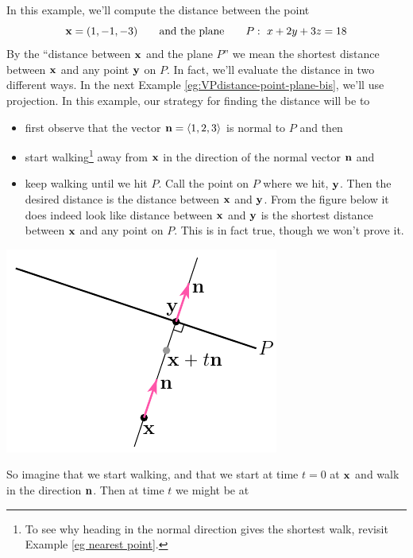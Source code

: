 \begin{eg}\label{eg:VPdistance-point-plane}
In this example, we'll compute the distance between the point
\begin{equation*}
\mathbf{x} = (1,-1,-3) \qquad\text{and the plane}\qquad
P:\ x+2y+3z=18
\end{equation*}
By the ``distance between $\mathbf{x}$ and the plane $P$'' we mean the shortest
distance between $\mathbf{x}$ and any point $\mathbf{y}$ on $P$. In fact, we'll evaluate the
distance in two different ways. In the next 
Example \ref{eg:VPdistance-point-plane-bis}, we'll use projection.
In this example, our strategy for finding the distance will be to
\begin{itemize}
\item first observe that the vector $\mathbf{n}=\left< 1,2,3\right>$ is normal to $P$ 
and then
\item start walking\footnote{To see why heading in the normal direction gives
the shortest walk, revisit Example \ref{eg nearest point}.} away from $\mathbf{x}$ 
in the  direction of the normal vector $\mathbf{n}$ and
\item keep walking until we hit $P$. Call the point on $P$ where we hit,
$\mathbf{y}$. Then the desired distance is the distance between $\mathbf{x}$ and $\mathbf{y}$.
From the figure below it does indeed look like distance between $\mathbf{x}$ and $\mathbf{y}$
is the shortest distance between $\mathbf{x}$ and any point on $P$. This is in 
fact true, though we won't prove it.
\end{itemize}
\begin{efig}
\begin{center}
   \includegraphics{pointDist.pdf}
\end{center}
\end{efig}
So imagine that we start walking, and that we start at time $t=0$ at $\mathbf{x}$ 
and walk in the direction $\mathbf{n}$. Then at time $t$ we might be at
\begin{equation*}

\end{equation*}
\end{eg}
